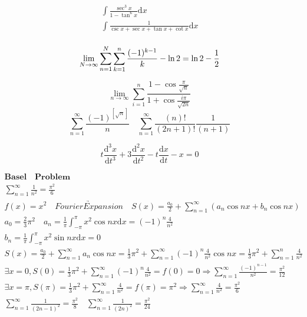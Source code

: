 \documentclass{article}
\begin{document}
\begin{align*}
    \int\frac{\sec^3 x}{1-\tan^6 x}\mathrm{d}x \\
    \int\frac{1}{\csc x+\sec x+\tan x +\cot x}\mathrm{d}x \\ 
\end{align*}

\clearpage
\begin{displaymath}
    \lim_{N \to \infty}\sum_{n=1}^N\sum_{k=1}^n\frac{(-1)^{k-1}}{k}-\ln 2  = \ln 2-\frac{1}{2} \newline 
\end{displaymath}

\begin{displaymath}
    \lim_{n \to \infty}\sum_{i=1}^{n}\frac{1-\cos\frac{\pi}{\sqrt{n}}}{1+\cos\frac{i\pi}{\sqrt{2n}}}
\end{displaymath}
\begin{displaymath}
    \sum_{n=1 }^\infty \frac{(-1)^{[\sqrt{n}]}}{n} \quad 
    \sum_{n=1}^{\infty} \frac{(n)!}{(2n+1)!}\frac{1}{(n+1)} 
\end{displaymath}

\begin{displaymath}
    t\frac{\mathrm{d}^3x}{\mathrm{d}t^3} + 3\frac{\mathrm{d}^2x}{\mathrm{d}t^2}-t\frac{\mathrm{d}x}{\mathrm{d}t}-x = 0
\end{displaymath}



\begin{align*}
    \bm{Basel \quad Problem} \\
    \sum_{n=1}^{\infty} \frac{1}{n^2} = \frac{\pi^2}{6} \\ 
    f(x) = x^2 \quad \underrightarrow{Fourier Expansion} \quad S(x) = \frac{a_{0}}{2}+\sum_{n=1}^{\infty}\left(a_{n}\cos nx+b_{n}\cos nx \right) \\
    a_{0} = \frac{2}{3}\pi^{2} \quad a_{n} = \frac{1}{\pi}\int_{-\pi}^{\pi} x^2 \cos nx \mathrm{d}x = (-1)^{n}\frac{4}{n^2}\\
    b_{n} = \frac{1}{\pi}\int_{-\pi}^{\pi} x^2 \sin nx \mathrm{d}x = 0 \\     
    S(x) = \frac{a_{0}}{2}+\sum_{n=1}^{\infty}a_{n}\cos nx= \frac{1}{3}\pi^{2} + \sum_{n=1}^{\infty}(-1)^{n}\frac{4}{n^2}\cos nx = \frac{1}{3}\pi^{2} + \sum_{n=1}^n\frac{4}{n^2} \\
    \exists x = 0, S(0) = \frac{1}{3}\pi^{2} + \sum_{n=1}^{\infty}(-1)^{n}\frac{4}{n^2} = f(0) = 0 \Longrightarrow \sum_{n=1}^{\infty}\frac{(-1)^{n-1}}{n^2} = \frac{\pi^{2}}{12}\\
    \exists x = \pi, S(\pi) = \frac{1}{3}\pi^{2} + \sum_{n=1}^{\infty}\frac{4}{n^2} = f(\pi) = \pi^2 \Longrightarrow \sum_{n=1}^{\infty}\frac{4}{n^2} = \frac{\pi^{2}}{6} \\ 
    \sum_{n=1}^{\infty}\frac{1}{(2n-1)^2} = \frac{\pi^{2}}{8} \quad \sum_{n=1}^{\infty}\frac{1}{(2n)^2} = \frac{\pi^{2}}{24} \\  
\end{align*}
\end{document}
